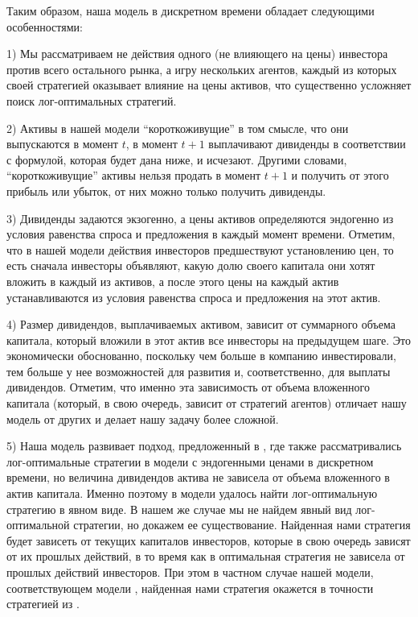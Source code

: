 \documentclass[a4paper,12pt,russian]{article} %
\theoremstyle{definition}
\begin{document}
Таким образом, наша модель в дискретном времени обладает следующими особенностями: 

1) Мы рассматриваем не действия одного (не влияющего на цены) инвестора против всего остального рынка, а игру нескольких агентов, каждый из которых своей стратегией оказывает влияние на цены активов, что существенно усложняет поиск лог-оптимальных стратегий.

2) Активы в нашей модели ``короткоживущие'' в том смысле, что они 
выпускаются в момент $t$, в момент $t+1$ выплачивают дивиденды в соответствии с формулой, которая будет дана ниже, и исчезают. Другими словами, ``короткоживущие'' активы нельзя продать в момент $t+1$ и получить от этого прибыль или убыток, от них можно только получить дивиденды.

3) Дивиденды задаются экзогенно, а цены активов определяются эндогенно из условия равенства спроса и предложения в каждый момент времени. Отметим, что в нашей модели действия инвесторов предшествуют установлению цен, то есть сначала инвесторы объявляют, какую долю своего капитала они хотят вложить в каждый из активов, а после этого цены на каждый актив устанавливаются из условия равенства спроса и предложения на этот актив. 

4) Размер дивидендов, выплачиваемых активом, зависит от суммарного объема капитала, который вложили в этот актив все инвесторы на предыдущем шаге. Это экономически обоснованно, поскольку чем больше в компанию инвестировали, тем больше у нее возможностей для развития и, соответственно, для выплаты дивидендов. Отметим, что именно эта зависимость от объема вложенного капитала (который, в свою очередь, зависит от стратегий агентов) отличает нашу модель от других и делает нашу задачу более сложной.

5) Наша модель развивает подход, предложенный в \cite{Amir2013}, где также рассматривались лог-оптимальные стратегии в модели с эндогенными ценами в дискретном времени, но величина дивидендов актива не зависела от объема вложенного в актив капитала.
Именно поэтому в модели \cite{Amir2013} удалось найти лог-оптимальную стратегию в явном виде. В нашем же случае мы не найдем явный вид лог-оптимальной стратегии, но докажем ее существование. Найденная нами стратегия 
будет зависеть от текущих капиталов инвесторов, которые в свою очередь зависят от их прошлых действий, в то время как в \cite{Amir2013} оптимальная стратегия не зависела от прошлых действий инвесторов. При этом в частном случае нашей модели, соответствующем модели \cite{Amir2013}, найденная нами стратегия окажется в точности стратегией из \cite{Amir2013}.
\end{document}
